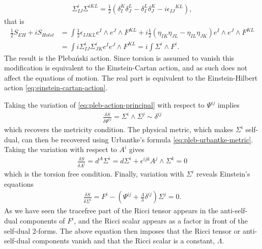 \documentclass[10pt]{report}
\newcommand{\pleb}[0]{Pleba\'nski}
\newcommand{\urb}[0]{Urbantke}
\theoremstyle{definition}
\begin{document}
\begin{align*}
\Sigma^i_{IJ} \Sigma^{iKL} = \frac{1}{2}\left(\delta_I^K \delta_J^L - \delta_I^L \delta_J^K - i \epsilon_{IJ}{}^{KL} \right),
\end{align*}
that is
\begin{align}
    \frac{1}{2} S_{EH} + i S_{Holst} & = \int \frac{1}{2} \epsilon_{IJKL} e^I \wedge e^J \wedge F^{KL} + i \frac{1}{2}\left( \eta_{IK} \eta_{JL} - \eta_{IL} \eta_{JK} \right) e^I \wedge e^J \wedge F^{KL} \\
                                     & = \int i \Sigma^i_{IJ} \Sigma^i_{JK} e^I e^J \wedge F^{KL} = i \int \Sigma^i \wedge F^i.
\end{align}
The result is the \pleb{} action. Since torsion is assumed to vanish this modification is equivalent to the Einstein-Cartan action, and as such does not affect the equations of motion. The real part is equivalent to the Einstein-Hilbert action \cref{eq:einstein-cartan-action}. 

Taking the variation of \cref{eq:pleb-action-principal} with respect to $\Psi^{ij}$ implies 
\begin{align}
    \frac{\delta S}{\delta \Psi^{ij}} = \Sigma^i \wedge \Sigma^j \sim \delta^{ij}
\end{align}
which recovers the metricity condition. The physical metric, which makes $\Sigma^i$ self-dual, can then be recovered using \urb{}'s formula \cref{eq:pleb-urbantke-metric}. Taking the variation with respect to $A^i$ gives 
\begin{align}
    \frac{\delta S}{\delta A^i} = d^A \Sigma^i = d\Sigma^i + \epsilon^{ijk} A^j \wedge \Sigma^k = 0
\end{align}
which is the torsion free condition. Finally, variation with $\Sigma^i$ reveals Einstein's equations 
\begin{align}
    \frac{\delta S}{\delta \Sigma^i} = F^i - \left( \Psi^{ij} + \frac{\Lambda}{3} \delta^{ij} \right) \Sigma^j = 0.
\end{align}
As we have seen the tracefree part of the Ricci tensor appears in the anti-self-dual components of $F^i$, and the Ricci scalar appears as a factor in front of the self-dual 2-forms. The above equation then imposes that the Ricci tensor or anti-self-dual components vanish and that the Ricci scalar is a constant, $\Lambda$.
\end{document}
